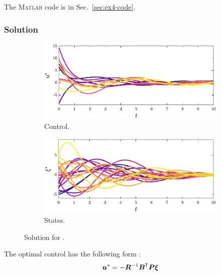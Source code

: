 \noindent The \textsc{Matlab} code is in Sec.~\ref{sec:ex4-code}.

\subsubsection{Solution} \label{sec:ch5:ex4:solution}

\begin{figure}
\centering

\begin{subfigure}{0.5\textwidth}
\centering
\includegraphics[width=\textwidth]{../ch5/figures/ex4sol-controls}%
\caption{Control.}
\label{fig:ch5:ex4sol:controls}
\end{subfigure}%
\begin{subfigure}{0.5\textwidth}
\centering
\includegraphics[width=\textwidth]{../ch5/figures/ex4sol-states}%
\caption{States.}
\label{fig:ch5:ex4sol:states}
\end{subfigure}%

\caption{Solution for .}
\label{fig:ch5:ex4sol}
\end{figure}

The optimal control has the following form \cite{Bryson1975a,Liberzon2012a}:
\begin{align}
\bm{u}^* = - \bm{R}^{-1} \bm{B}^{\mkern-1.5mu\mathsf{T}} \bm{P} \bm{\xi}
\end{align}

